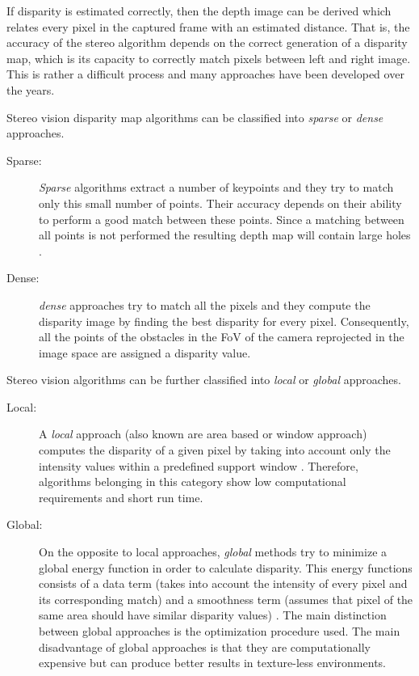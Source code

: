 If disparity is estimated correctly, then the depth image can be derived which relates every pixel in the captured frame with an estimated distance. That is, the accuracy of the stereo algorithm depends on the correct generation of a disparity map, which is its capacity to correctly match pixels between left and right image. This is rather a difficult process and many approaches have been developed over the years. 

Stereo vision disparity map algorithms can be classified into \textit{sparse }or \textit{dense }approaches.

\begin{description}
	\item[Sparse: ] \textit{Sparse }algorithms extract a number of keypoints and they try to match only this small number of points. Their accuracy depends on their ability to perform a good match between these points. Since a matching between all points is not performed the resulting depth map will contain large holes \cite{Dijk}.
	\item[Dense: ] \textit{dense }approaches try to match all the pixels and they compute the disparity image by finding the best disparity for every pixel. Consequently, all the points of the obstacles in the \ac{FoV} of the camera reprojected in the image space are assigned a disparity value. 
\end{description}

Stereo vision algorithms can be further classified into \textit{local }or \textit{global }approaches. 

\begin{description}
	\item[Local: ] A \textit{local }approach (also known are area based or window approach) computes the disparity of a given pixel by taking into account only the intensity values within a predefined support window \cite{Hamzah2016a}. Therefore, algorithms belonging in this category show low computational requirements and short run time.
	\item[Global: ] On the opposite to local approaches, \textit{global} methods try to minimize a global energy function in order to calculate disparity. This energy functions consists of a data term (takes into account the intensity of every pixel and its corresponding match) and a smoothness term (assumes that pixel of the same area should have similar disparity values) \cite{Hamzah2016a}. The main distinction between global approaches is the optimization procedure used. The main disadvantage of global approaches is that they are computationally expensive but can produce better results in texture-less environments.
\end{description}


